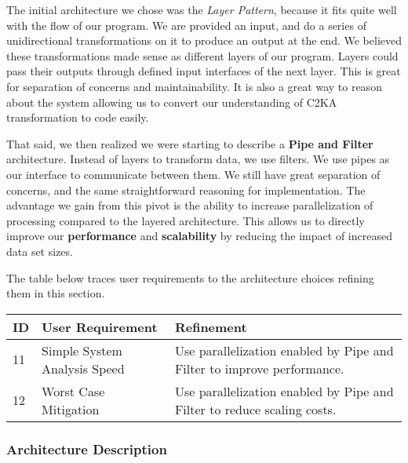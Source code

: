 \documentclass[11pt]{article}
\begin{document}
    The initial architecture we chose was the \textit{Layer Pattern}, because it fits quite well with the flow of our program.
    We are provided an input, and do a series of unidirectional transformations on it to produce an output at the end.
    We believed these transformations made sense as different layers of our program.
    Layers could pass their outputs through defined input interfaces of the next layer.
    This is great for separation of concerns and maintainability.
    It is also a great way to reason about the system allowing us to convert our understanding of C2KA transformation to code easily.

    That said, we then realized we were starting to describe a \textbf{Pipe and Filter} architecture.
    Instead of layers to transform data, we use filters.
    We use pipes as our interface to communicate between them.
    We still have great separation of concerns, and the same straightforward reasoning for implementation.
    The advantage we gain from this pivot is the ability to increase parallelization of processing compared to the layered architecture.
    This allows us to directly improve our \textbf{performance} and \textbf{scalability} by reducing the impact of increased data set sizes.

    The table below traces user requirements to the architecture choices refining them in this section.

    \begin{table}[htbp]
        \centering
        \begin{tabularx}{\textwidth}{| l | l | X |}
            \hline
            \textbf{ID} & \textbf{User Requirement} & \textbf{Refinement} \\
            \hline
            11 & Simple System Analysis Speed & Use parallelization enabled by Pipe and Filter to improve performance. \\ \hline
            12 & Worst Case Mitigation & Use parallelization enabled by Pipe and Filter to reduce scaling costs.  \\ \hline
        \end{tabularx}\label{tab:arch-choice-table}
    \end{table}

    \newpage
    \subsubsection{Architecture Description}\label{subsubsec:arch-desc}
\end{document}
